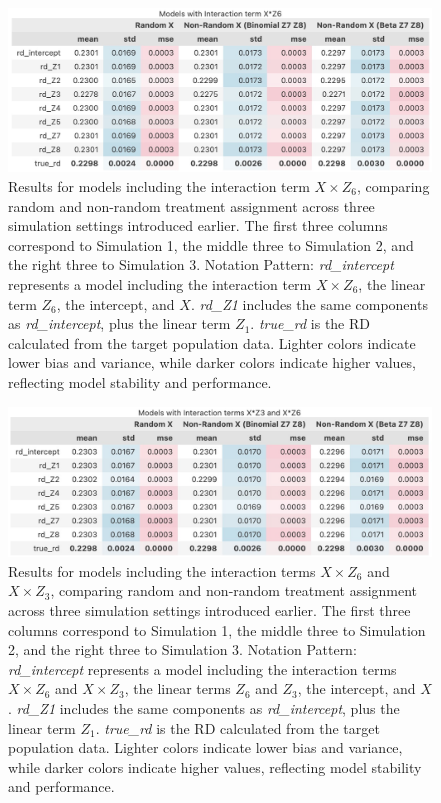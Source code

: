 \documentclass[12pt,oneside]{amsart}
\theoremstyle{definition}
\theoremstyle{remark}
\numberwithin{equation}{section}
\begin{document}
\begin{figure}[h]
    \centering
    \includegraphics[scale=0.22]{Report/Figure/om_xz6.jpg}
    \caption{Results for models including the interaction term $X \times Z_6$, comparing random and non-random treatment assignment across three simulation settings introduced earlier. The first three columns correspond to Simulation 1, the middle three to Simulation 2, and the right three to Simulation 3. Notation Pattern: \textit{rd\_intercept} represents a model including the interaction term $X \times Z_6$, the linear term $Z_6$, the intercept, and $X$. \textit{rd\_Z1} includes the same components as \textit{rd\_intercept}, plus the linear term $Z_1$. \textit{true\_rd} is the RD calculated from the target population data. Lighter colors indicate lower bias and variance, while darker colors indicate higher values, reflecting model stability and performance.}
    \label{fig:om_xz6}
\end{figure}

\begin{figure}[h]
    \centering
    \includegraphics[scale=0.22]{Report/Figure/om_xz3z6.jpg}
    \caption{Results for models including the interaction terms $X \times Z_6$ and $X \times Z_3$, comparing random and non-random treatment assignment across three simulation settings introduced earlier. The first three columns correspond to Simulation 1, the middle three to Simulation 2, and the right three to Simulation 3. Notation Pattern: \textit{rd\_intercept} represents a model including the interaction terms $X \times Z_6$ and $X \times Z_3$, the linear terms $Z_6$ and $Z_3$, the intercept, and $X$. \textit{rd\_Z1} includes the same components as \textit{rd\_intercept}, plus the linear term $Z_1$. \textit{true\_rd} is the RD calculated from the target population data. Lighter colors indicate lower bias and variance, while darker colors indicate higher values, reflecting model stability and performance.}
    \label{fig:om_xz3z6}
\end{figure}
\end{document}
